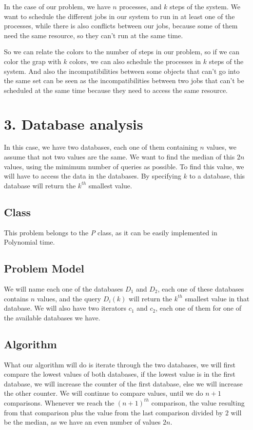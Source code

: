 \documentclass{article}
\begin{document}
In the case of our problem, we have $n$ processes, and $k$ steps of the system. We want to schedule the different jobs in our system to run in at least one of the processes, while there is also conflicts between our jobs, because some of them need the same resource, so they can't run at the same time.

So we can relate the colors to the number of steps in our problem, so if we can color the grap with $k$ colors, we can also schedule the processes in $k$ steps of the system. And also the incompatibilities between some objects that can't go into the same set can be seen as the incompatibilities between two jobs that can't be scheduled at the same time because they need to access the same resource.

\section*{3. Database analysis}

In this case, we have two databases, each one of them containing $n$ values, we assume that not two values are the same. We want to find the median of this $2n$ values, using the mimimum number of queries as possible. To find this value, we will have to access the data in the databases. By specifying $k$ to a database, this database will return the $k^{th}$ smallest value.

\subsection*{Class}

This problem belongs to the \textit{P} class, as it can be easily implemented in Polynomial time.

\subsection*{Problem Model}

We will name each one of the databases $D_1$ and $D_2$, each one of these databases contains $n$ values, and the query $D_i(k)$ will return the $k^{th}$ smallest value in that database. We will also have two iterators $c_1$ and $c_2$, each one of them for one of the available databases we have.

\subsection*{Algorithm}

What our algorithm will do is iterate through the two databases, we will first compare the lowest values of both databases, if the lowest value is in the first database, we will increase the counter of the first database, else we will increase the other counter. We will continue to compare values, until we do $n+1$ comparisons. Whenever we reach the $(n+1)^{th}$ comparison, the value resulting from that comparison plus the value from the last comparison divided by $2$ will be the median, as we have an even number of values $2n$.
\end{document}
